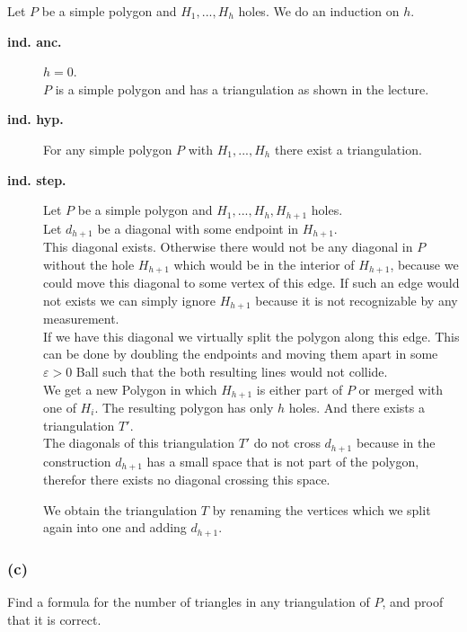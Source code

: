 \documentclass[11pt,a4paper,ngerman]{article}
\begin{document}
Let $P$ be a simple polygon and $H_1, ... , H_h$ holes. We do an induction on $h$.
\begin{description}
    \item[\bfseries ind. anc.] $h=0$.\\
        $P$ is a simple polygon and has a triangulation as shown in the lecture.
    \item[\bfseries ind. hyp.] For any simple polygon $P$ with $H_1, ... , H_h$ there exist a triangulation.
    \item[\bfseries ind. step.] Let $P$ be a simple polygon and $H_1, ... , H_h, H_{h+1}$ holes.\\
        Let $d_{h+1}$ be a diagonal with some endpoint in $H_{h+1}$.\\
        
        This diagonal exists. Otherwise there would not be any diagonal in $P$ without the hole $H_{h+1}$
        which would be in the interior of $H_{h+1}$, because we could move this diagonal to some vertex
        of this edge. If such an edge would not exists we can simply ignore $H_{h+1}$ because it is not
        recognizable by any measurement.\\

        If we have this diagonal we virtually split the polygon along this edge. This can be done by doubling the
        endpoints and moving them apart in some $\varepsilon > 0$ Ball such that the both resulting lines would not collide.\\

        We get a new Polygon in which $H_{h+1}$ is either part of $P$ or merged with one of $H_i$.
        The resulting polygon has only $h$ holes. And there exists a triangulation $T'$.\\

        The diagonals of this triangulation $T'$ do not cross $d_{h+1}$ because in the construction $d_{h+1}$ has a small space
        that is not part of the polygon, therefor there exists no diagonal crossing this space.

        We obtain the triangulation $T$ by renaming the vertices which we split again into one and adding $d_{h+1}$.
\end{description}

\subsubsection*{(c)}

Find a formula for the number of triangles in any triangulation of $P$, and proof that it is correct.\\
\end{document}
